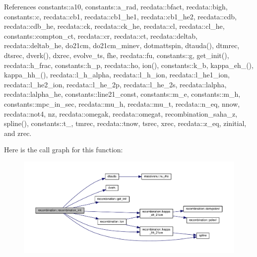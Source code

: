References constants\+::a10, constants\+::a\+\_\+rad, recdata\+::bfact, recdata\+::bigh, constants\+::c, recdata\+::cb1, recdata\+::cb1\+\_\+he1, recdata\+::cb1\+\_\+he2, recdata\+::cdb, recdata\+::cdb\+\_\+he, recdata\+::ck, recdata\+::ck\+\_\+he, recdata\+::cl, recdata\+::cl\+\_\+he, constants\+::compton\+\_\+ct, recdata\+::cr, recdata\+::ct, recdata\+::deltab, recdata\+::deltab\+\_\+he, do21cm, do21cm\+\_\+minev, dotmattspin, dtauda(), dtmrec, dtsrec, dverk(), dxrec, evolve\+\_\+ts, fhe, recdata\+::fu, constants\+::g, get\+\_\+init(), recdata\+::h\+\_\+frac, constants\+::h\+\_\+p, recdata\+::ho, ion(), constants\+::k\+\_\+b, kappa\+\_\+eh\+\_\+21cm(), kappa\+\_\+hh\+\_\+21cm(), recdata\+::l\+\_\+h\+\_\+alpha, recdata\+::l\+\_\+h\+\_\+ion, recdata\+::l\+\_\+he1\+\_\+ion, recdata\+::l\+\_\+he2\+\_\+ion, recdata\+::l\+\_\+he\+\_\+2p, recdata\+::l\+\_\+he\+\_\+2s, recdata\+::lalpha, recdata\+::lalpha\+\_\+he, constants\+::line21\+\_\+const, constants\+::m\+\_\+e, constants\+::m\+\_\+h, constants\+::mpc\+\_\+in\+\_\+sec, recdata\+::mu\+\_\+h, recdata\+::mu\+\_\+t, recdata\+::n\+\_\+eq, nnow, recdata\+::not4, nz, recdata\+::omegak, recdata\+::omegat, recombination\+\_\+saha\+\_\+z, spline(), constants\+::t\+\_\+21cm, tmrec, recdata\+::tnow, tsrec, xrec, recdata\+::z\+\_\+eq, zinitial, and zrec.

Here is the call graph for this function\+:
\nopagebreak
\begin{figure}[H]
\begin{center}
\leavevmode
\includegraphics[width=350pt]{namespacerecombination_ac2325c42e3b77187a31f6810929de147_cgraph}
\end{center}
\end{figure}
\mbox{\label{namespacerecombination_a30d82e415adca06a256aae1be85e72a1}} 

